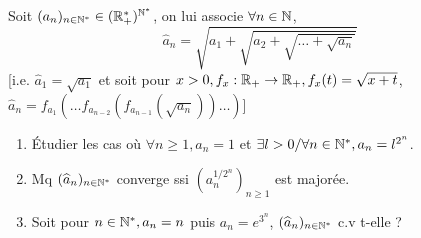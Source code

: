 \begin{statementbox}
Soit $(a_n)_{n \in \mathbb N^*} \in (\mathbb R_+^*)^{\mathbb N^*}$, on lui associe $\forall n \in \mathbb N$,
\[
\widehat{a}_n = \sqrt{a_1 + \sqrt{a_2 + \sqrt{\dots + \sqrt{a_n}}}}
\]
[i.e. $\widehat{a}_1 = \sqrt{a_1}$ et soit pour $x > 0, f_x : \mathbb R_+ \to \mathbb R_+, f_x(t) = \sqrt{x+t}$, $\widehat{a}_n = f_{a_1}(\dots f_{a_{n-2}}(f_{a_{n-1}}(\sqrt{a_n})) \dots)$]
\begin{enumerate}[label=\alph*)]
  \item Étudier les cas où $\forall n \geq 1, a_n = 1$ et $\exists l > 0 / \forall n \in \mathbb N^*, a_n = l^{2^n}$.
  \item Mq $(\widehat{a}_n)_{n \in \mathbb N^*}$ converge ssi $(a_n^{1/2^n})_{n \geq 1}$ est majorée.
  \item Soit pour $n \in \mathbb N^*, a_n = n$ puis $a_n = e^{3^n}$, $(\widehat{a}_n)_{n \in \mathbb N^*}$ c.v t-elle ?
\end{enumerate}
\end{statementbox}

